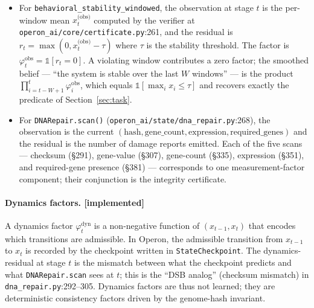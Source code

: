 \begin{itemize}[leftmargin=*,itemsep=2pt,topsep=2pt]
\item For \texttt{behavioral\_stability\_windowed}, the observation
  at stage $t$ is the per-window mean $x_t^{\text{(obs)}}$ computed
  by the verifier at
  \texttt{operon\_ai/core/certificate.py}:261, and the residual is
  $r_t = \max(0, x_t^{\text{(obs)}} - \tau)$ where $\tau$ is the
  stability threshold.  The factor is
  $\varphi^{\text{obs}}_t = \mathbb{1}[r_t = 0]$.  A violating window
  contributes a zero factor; the smoothed belief --- ``the system is
  stable over the last $W$ windows'' --- is the product
  $\prod_{i=t-W+1}^{t} \varphi^{\text{obs}}_i$, which equals
  $\mathbb{1}[\max_i x_i \le \tau]$ and recovers exactly the predicate
  of Section~\ref{sec:task}.
\item For \texttt{DNARepair.scan()}
  (\texttt{operon\_ai/state/dna\_repair.py}:268), the observation is
  the current $(\mathrm{hash}, \mathrm{gene\_count},
  \mathrm{expression}, \mathrm{required\_genes})$ and the residual is
  the number of damage reports emitted.  Each of the five scans ---
  checksum (\S291), gene-value (\S307), gene-count (\S335),
  expression (\S351), and required-gene presence (\S381) ---
  corresponds to one measurement-factor component; their conjunction
  is the integrity certificate.
\end{itemize}

\paragraph{Dynamics factors. [implemented]}
A dynamics factor $\varphi^{\text{dyn}}_t$ is a non-negative
function of $(x_{t-1}, x_t)$ that encodes which transitions are
admissible.  In Operon, the admissible transition from $x_{t-1}$ to
$x_t$ is recorded by the checkpoint written in
\texttt{StateCheckpoint}.  The dynamics-residual at stage $t$ is the
mismatch between what the checkpoint predicts and what
\texttt{DNARepair.scan} sees at $t$; this is the ``DSB analog''
(checksum mismatch) in \texttt{dna\_repair.py}:292--305.  Dynamics
factors are thus not learned; they are deterministic consistency
factors driven by the genome-hash invariant.

